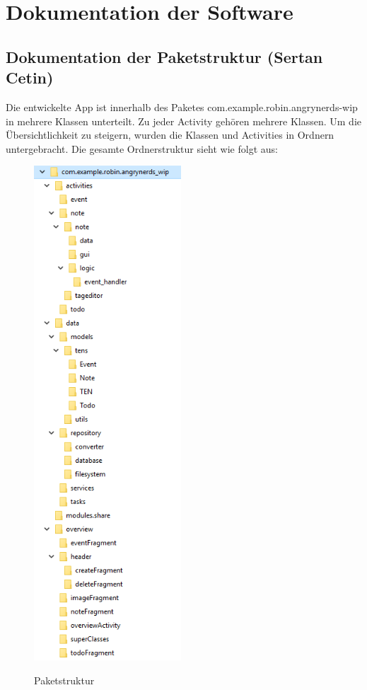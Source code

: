 \section{Dokumentation der Software}
\label{instal}

\subsection{Dokumentation der Paketstruktur (Sertan Cetin)}
Die entwickelte App ist innerhalb des Paketes com.example.robin.angrynerds-wip in mehrere Klassen unterteilt. Zu jeder Activity gehören mehrere Klassen. Um die Übersichtlichkeit zu steigern, wurden die Klassen und Activities in Ordnern untergebracht. Die gesamte Ordnerstruktur sieht wie folgt aus:

\begin{figure}[H]
\centering
\begin{minipage}[t]{1\textwidth} %
\caption{Paketstruktur} %
\includegraphics[width=5.5cm]{img/Projektordnerstruktur}\\ %
\end{minipage}
\end{figure}

